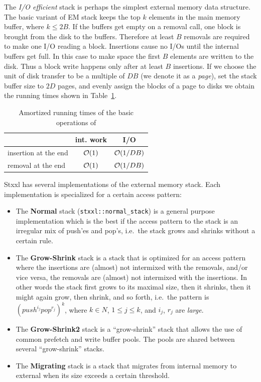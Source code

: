 \documentclass[twoside]{book}
\newcommand{\stxxl}{{\sc Stxxl} }
\begin{document}
The \emph{I/O efficient} stack is perhaps the simplest external memory
data structure. The basic variant of EM stack keeps the top $k$
elements in the main memory buffer, where $k \leq 2B$. If the buffers
get empty on a removal call, one block is brought from the disk to the
buffers. Therefore at least $B$ removals are required to make one I/O
reading a block. Insertions cause no I/Os until the internal buffers
get full. In this case to make space the first $B$ elements are
written to the disk. Thus a block write happens only after at least
$B$ insertions. If we choose the unit of disk
transfer to be a multiple of $DB$ (we denote it as a \emph{page}), set the
stack buffer size to $2D$ pages, and evenly assign the blocks of a
page to disks we obtain the running times shown in
Table~\ref{rtstack}. 

\begin{table}[h]
\begin{center}
\caption{Amortized running times of the basic operations of \xstack}
\label{rtstack}
\begin{tabular}{|l|c|c|}
\hline
                    & int. work & I/O \\
\hline\hline
insertion at the end& $\mathcal{O}\!\left( 1\right)$ & $\mathcal{O}\!\left( 1/DB\right)$\\
\hline
removal at the end  & $\mathcal{O}\!\left( 1\right)$ & $\mathcal{O}\!\left( 1/DB\right)$ \\
\hline
\end{tabular}
\end{center}
\end{table}

\stxxl has several implementations of the external memory stack. Each 
implementation is specialized for a certain access pattern:
\begin{itemize}
\item The {\bf Normal } stack (\texttt{stxxl::normal\_stack}) is a general
purpose implementation which is the best if the access pattern
to the stack is an irregular mix of push'es and pop's, i.e.\ the stack
grows and shrinks without a certain rule.
\item The {\bf Grow-Shrink} stack is a stack that is optimized for an
access pattern where the insertions are (almost) not intermixed with
the removals, and/or vice versa, the removals are (almost) not
intermixed with the insertions. In other words the stack first grows
to its maximal size, then it shrinks, then it might again grow, then
shrink, and so forth, i.e.\ the pattern is
$(push^{i_j}pop^{r_j})^k$, where $k \in N$, $1\leq j\leq k$, and
$i_j$, $r_j$ are \emph{large}. 
\item The {\bf Grow-Shrink2} stack is a ``grow-shrink'' stack that
allows the use of common prefetch and write buffer pools. The pools
are shared between several ``grow-shrink'' stacks.
\item The {\bf Migrating} stack is a stack that migrates from
internal memory to external when its size exceeds a certain
threshold. 
\end{itemize}
\end{document}
